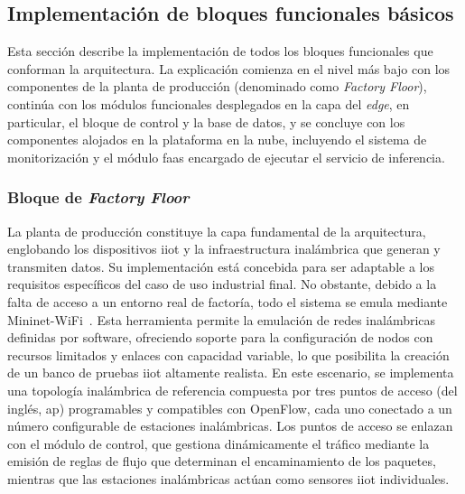 \subsection{Implementación de bloques funcionales básicos}
\label{subsec:blocks}   

Esta sección describe la implementación de todos los bloques funcionales que conforman la arquitectura. La explicación comienza en el nivel más bajo con los componentes de la planta de producción (denominado como \textit{Factory Floor}), continúa con los módulos funcionales desplegados en la capa del \textit{edge}, en particular, el bloque de control y la base de datos, y se concluye con los componentes alojados en la plataforma en la nube, incluyendo el sistema de monitorización y el módulo \gls{faas} encargado de ejecutar el servicio de inferencia.


\subsubsection{Bloque de \textit{Factory Floor}}
\label{subsubsec:factoryfloor}

La planta de producción constituye la capa fundamental de la arquitectura, englobando los dispositivos \gls{iiot} y la infraestructura inalámbrica que generan y transmiten datos. Su implementación está concebida para ser adaptable a los requisitos específicos del caso de uso industrial final. No obstante, debido a la falta de acceso a un entorno real de factoría, todo el sistema se emula mediante Mininet-WiFi~\cite{mininet-wifi}. Esta herramienta permite la emulación de redes inalámbricas definidas por software, ofreciendo soporte para la configuración de nodos con recursos limitados y enlaces con capacidad variable, lo que posibilita la creación de un banco de pruebas \gls{iiot} altamente realista.  En este escenario, se implementa una topología inalámbrica de referencia compuesta por tres puntos de acceso (del inglés, \gls{ap}) programables y compatibles con OpenFlow, cada uno conectado a un número configurable de estaciones inalámbricas. Los puntos de acceso se enlazan con el módulo de control, que gestiona dinámicamente el tráfico mediante la emisión de reglas de flujo que determinan el encaminamiento de los paquetes, mientras que las estaciones inalámbricas actúan como sensores \gls{iiot} individuales.


